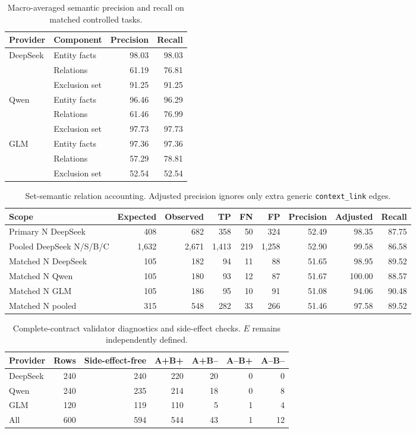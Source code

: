 \documentclass[11pt]{article}
\newcommand{\Eoutcome}{E}
\begin{document}
\begin{table}[h]
\centering
\caption{Macro-averaged semantic precision and recall on matched controlled tasks.}
\label{tab:macro_semantic}
\small
\begin{tabular}{@{}llrr@{}}
\toprule
Provider & Component & Precision & Recall \\
\midrule
DeepSeek & Entity facts & 98.03 & 98.03 \\
 & Relations & 61.19 & 76.81 \\
 & Exclusion set & 91.25 & 91.25 \\
Qwen & Entity facts & 96.46 & 96.29 \\
 & Relations & 61.46 & 76.99 \\
 & Exclusion set & 97.73 & 97.73 \\
GLM & Entity facts & 97.36 & 97.36 \\
 & Relations & 57.29 & 78.81 \\
 & Exclusion set & 52.54 & 52.54 \\
\bottomrule
\end{tabular}
\end{table}

\begin{table}[h]
\centering
\caption{Set-semantic relation accounting. Adjusted precision ignores only extra generic \texttt{context\_link} edges.}
\label{tab:relations}
\scriptsize
\begin{tabular}{@{}lrrrrrrrr@{}}
\toprule
Scope & Expected & Observed & TP & FN & FP & Precision & Adjusted & Recall \\
\midrule
Primary N DeepSeek & 408 & 682 & 358 & 50 & 324 & 52.49 & 98.35 & 87.75 \\
Pooled DeepSeek N/S/B/C & 1,632 & 2,671 & 1,413 & 219 & 1,258 & 52.90 & 99.58 & 86.58 \\
Matched N DeepSeek & 105 & 182 & 94 & 11 & 88 & 51.65 & 98.95 & 89.52 \\
Matched N Qwen & 105 & 180 & 93 & 12 & 87 & 51.67 & 100.00 & 88.57 \\
Matched N GLM & 105 & 186 & 95 & 10 & 91 & 51.08 & 94.06 & 90.48 \\
Matched N pooled & 315 & 548 & 282 & 33 & 266 & 51.46 & 97.58 & 89.52 \\
\bottomrule
\end{tabular}
\end{table}

\begin{table}[h]
\centering
\caption{Complete-contract validator diagnostics and side-effect checks. \(\Eoutcome\) remains independently defined.}
\label{tab:validators}
\small
\begin{tabular}{@{}lrrrrrr@{}}
\toprule
Provider & Rows & Side-effect-free & A+B+ & A+B-- & A--B+ & A--B-- \\
\midrule
DeepSeek & 240 & 240 & 220 & 20 & 0 & 0 \\
Qwen & 240 & 235 & 214 & 18 & 0 & 8 \\
GLM & 120 & 119 & 110 & 5 & 1 & 4 \\
All & 600 & 594 & 544 & 43 & 1 & 12 \\
\bottomrule
\end{tabular}
\end{table}
\end{document}
